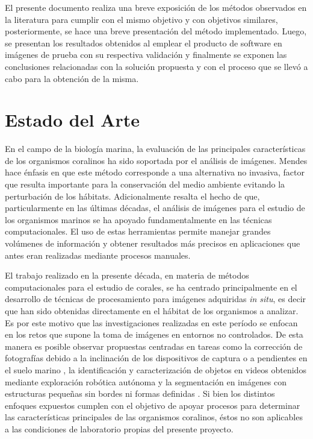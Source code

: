 \documentclass[journal]{IEEEtran}
\begin{document}
\begin{par}
El presente documento realiza una breve exposición de los métodos observados en la literatura para cumplir con el mismo objetivo y con objetivos similares, posteriormente, se hace una breve presentación del método implementado. Luego, se presentan los resultados obtenidos al emplear el producto de software en imágenes de prueba con su respectiva validación y finalmente se exponen las conclusiones relacionadas con la solución propuesta y con el proceso que se llevó a cabo para la obtención de la misma.
\end{par}


\section{Estado del Arte}
En el campo de la biología marina, la evaluación de las principales características de
los organismos coralinos ha sido soportada por el análisis de imágenes. Mendes
\cite{estrellas} hace énfasis en que este método corresponde a una alternativa no
invasiva, factor que resulta importante para la conservación del medio ambiente evitando
la perturbación de los hábitats. Adicionalmente resalta el hecho de que, particularmente
en las últimas décadas, el análisis de imágenes para el estudio de los organismos marinos
se ha apoyado fundamentalmente en las técnicas computacionales. El uso de estas
herramientas permite manejar grandes volúmenes de información y obtener resultados más
precisos en aplicaciones que antes eran realizadas mediante procesos manuales. 

El trabajo realizado en la presente década, en materia de métodos computacionales para el
estudio de corales, se ha centrado principalmente en el desarrollo de técnicas de
procesamiento para imágenes adquiridas \textit{in situ}, es decir que han sido obtenidas
directamente en el hábitat de los organismos a analizar. Es por este motivo que las
investigaciones realizadas en este período se enfocan en los retos que supone la toma de
imágenes en entornos no controlados. De esta manera es posible observar propuestas
centradas en tareas como la corrección de fotografías debido a la inclinación de los
dispositivos de captura o a pendientes en el suelo marino \cite{slope}, la identificación
y caracterización de objetos en videos obtenidos mediante exploración robótica autónoma
\cite{exprobots} y la segmentación en imágenes con estructuras pequeñas sin bordes ni
formas definidas \cite{pequenosinforma}. Si bien los distintos enfoques expuestos cumplen
con el objetivo de apoyar procesos para determinar las características principales de las
organismos coralinos, éstos no son aplicables a las condiciones de laboratorio propias
del presente proyecto. 
\end{document}
